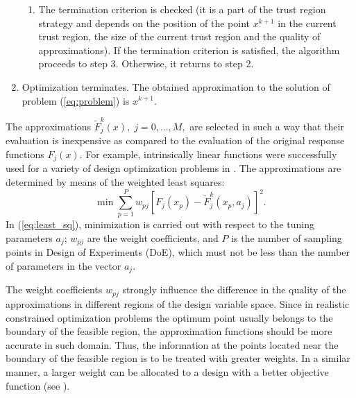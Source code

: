 \documentclass[a4paper]{llncs}
\begin{document}
\begin{enumerate}
\begin{enumerate}[label=(\alph*)]
    \item The termination criterion is checked (it is a part of the
        trust region strategy and depends on the position of the point
        $ x^{k+1}$ in the current trust region, the size of the current
        trust region and the quality of approximations). If the
        termination criterion is satisfied, the algorithm proceeds to
        step 3. Otherwise, it returns to step 2.
  \end{enumerate}
  \item Optimization terminates. The obtained approximation to the solution
      of problem (\ref{eq:problem}) is $ x^{k+1}$.
\end{enumerate}

The approximations $\widetilde{F}^k_j(x),\; j=0, \dots ,M,$ are selected in
such a way that their evaluation is inexpensive as compared to the evaluation
of the original response functions $F_j(x)$. For example, intrinsically linear
functions were successfully used for a variety of design optimization problems
in \cite{ToropovFilatov1993,KeulenToropov1997}. The approximations are
determined by means of the weighted least squares:
\begin{equation}\label{eq:least_sq}
\min \sum_{p=1}^P{w_{pj}\left[ F_j(x_p)- \widetilde{F}^k_j(x_p,a_j) \right]^2}.
\end{equation}
In (\ref{eq:least_sq}), minimization is carried out with respect to the tuning
parameters $a_j$; $w_{pj}$ are the weight coefficients, and $P$ is the number
of sampling points in Design of Experiments (DoE), which must not be less than
the number of parameters in the vector $a_j$.

The weight coefficients $w_{pj}$ strongly influence the difference in the
quality of the approximations in different regions of the design variable
space. Since in realistic constrained optimization problems the optimum point
usually belongs to the boundary of the feasible region, the approximation
functions should be more accurate in such domain. Thus, the information at the
points located near the boundary of the feasible region is to be treated with
greater weights. In a similar manner, a larger weight can be allocated to a
design with a better objective function (see
\cite{ToropovFilatov1993,KeulenToropov1997}).
\end{document}
